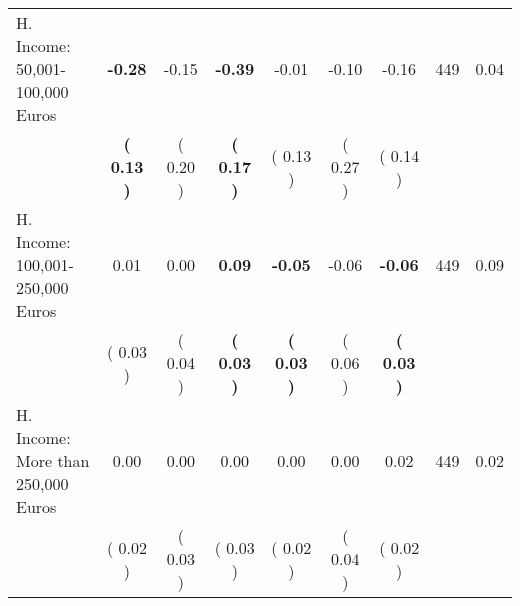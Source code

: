 \begin{tabular}{lcccccccc}
H. Income: 50,001-100,000 Euros & \textbf{    -0.28} &     -0.15 & \textbf{    -0.39} &     -0.01 &     -0.10 &     -0.16 & 449 &       0.04 \\ 
 & \textbf{(     0.13 )} & (     0.20 ) & \textbf{(     0.17 )} & (     0.13 ) & (     0.27 ) & (     0.14 ) & \\
H. Income: 100,001-250,000 Euros &      0.01 &      0.00 & \textbf{     0.09} & \textbf{    -0.05} &     -0.06 & \textbf{    -0.06} & 449 &       0.09 \\ 
 & (     0.03 ) & (     0.04 ) & \textbf{(     0.03 )} & \textbf{(     0.03 )} & (     0.06 ) & \textbf{(     0.03 )} & \\
H. Income: More than 250,000 Euros &      0.00 &      0.00 &      0.00 &      0.00 &      0.00 &      0.02 & 449 &       0.02 \\ 
 & (     0.02 ) & (     0.03 ) & (     0.03 ) & (     0.02 ) & (     0.04 ) & (     0.02 ) & \\
\bottomrule
\end{tabular}

